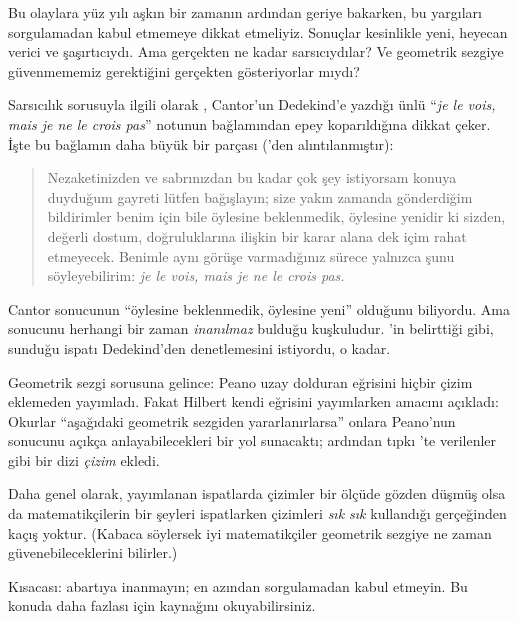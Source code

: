 \documentclass[../../../include/open-logic-section]{subfiles}
\begin{document}


Bu olaylara yüz yılı aşkın bir zamanın ardından geriye bakarken, bu yargıları
sorgulamadan kabul etmemeye dikkat etmeliyiz. Sonuçlar kesinlikle yeni,
heyecan verici ve şaşırtıcıydı. Ama gerçekten ne kadar sarsıcıydılar? Ve
geometrik sezgiye güvenmememiz gerektiğini gerçekten gösteriyorlar mıydı?

Sarsıcılık sorusuyla ilgili olarak \citet{Gouvea2011}, Cantor'un Dedekind'e
yazdığı ünlü ``\emph{je le vois, mais je ne le crois pas}'' notunun
bağlamından epey koparıldığına dikkat çeker. İşte bu bağlamın daha büyük bir
parçası (\citeauthor{Gouvea2011}'den alıntılanmıştır):
\begin{quote}
Nezaketinizden ve sabrınızdan bu kadar çok şey istiyorsam konuya duyduğum
gayreti lütfen bağışlayın; size yakın zamanda gönderdiğim bildirimler benim
için bile öylesine beklenmedik, öylesine yenidir ki sizden, değerli dostum,
doğruluklarına ilişkin bir karar alana dek içim rahat etmeyecek. Benimle aynı
görüşe varmadığınız sürece yalnızca şunu söyleyebilirim: \emph{je le vois,
mais je ne le crois pas.}
\end{quote}
Cantor sonucunun ``öylesine beklenmedik, öylesine yeni'' olduğunu biliyordu.
Ama sonucunu herhangi bir zaman \emph{inanılmaz} bulduğu kuşkuludur.
\citeauthor{Gouvea2011}'in belirttiği gibi, sunduğu ispatı Dedekind'den
denetlemesini istiyordu, o kadar.

Geometrik sezgi sorusuna gelince: Peano uzay dolduran eğrisini hiçbir çizim
eklemeden yayımladı. Fakat Hilbert kendi eğrisini yayımlarken amacını açıkladı:
Okurlar ``aşağıdaki geometrik sezgiden yararlanırlarsa'' onlara Peano'nun
sonucunu açıkça anlayabilecekleri bir yol sunacaktı; ardından tıpkı
'te verilenler gibi bir dizi \emph{çizim}
ekledi.

Daha genel olarak, yayımlanan ispatlarda çizimler bir ölçüde gözden düşmüş
olsa da matematikçilerin bir şeyleri ispatlarken çizimleri \emph{sık sık}
kullandığı gerçeğinden kaçış yoktur. (Kabaca söylersek iyi matematikçiler
geometrik sezgiye ne zaman güvenebileceklerini bilirler.)

Kısacası: abartıya inanmayın; en azından sorgulamadan kabul etmeyin. Bu konuda
daha fazlası için \citet{Giaquinto2007} kaynağını okuyabilirsiniz.
\end{document}
